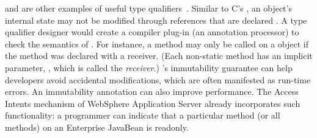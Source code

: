 \documentclass[10pt]{article}
\begin{document}



 and  are other examples of useful type
qualifiers~\cite{ZibinPAAKE2007,BirkaE2004,TschantzE2005,GreenfieldboyceF2005,KnieselT2001,SkoglundW2001,PoratBKM2000}.
Similar to C's , an object's internal state may not be modified
through references that are declared . A type qualifier
designer would create a compiler plug-in (an annotation processor) to check
the semantics of .  For instance, a method may only be
called on a  object if the method was declared with a
 receiver.
(Each non-static method has an implicit parameter, , which is
called the \emph{receiver}.)
's immutability guarantee can
help developers avoid accidental modifications, which are often manifested
as run-time errors.
An immutability annotation can also improve performance.
The Access Intents mechanism of WebSphere Application Server already
incorporates such functionality:
a programmer can indicate that a particular method (or all methods) on
an Enterprise JavaBean is readonly.
\end{document}
